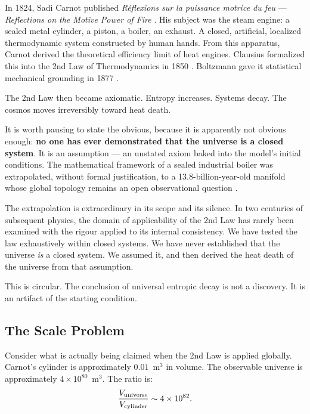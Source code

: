 \documentclass[aps,prd,11pt,onecolumn,superscriptaddress,nofootinbib,floatfix]{revtex4-2}
\begin{document}
In 1824, Sadi Carnot published \textit{R\'eflexions sur la puissance motrice du feu} --- \textit{Reflections on the Motive Power of Fire} \cite{carnot_1824}. His subject was the steam engine: a sealed metal cylinder, a piston, a boiler, an exhaust. A closed, artificial, localized thermodynamic system constructed by human hands. From this apparatus, Carnot derived the theoretical efficiency limit of heat engines. Clausius formalized this into the 2nd Law of Thermodynamics in 1850 \cite{clausius_1850}. Boltzmann gave it statistical mechanical grounding in 1877 \cite{boltzmann_1877}.

The 2nd Law then became axiomatic. Entropy increases. Systems decay. The cosmos moves irreversibly toward heat death.

It is worth pausing to state the obvious, because it is apparently not obvious enough: \textbf{no one has ever demonstrated that the universe is a closed system}. It is an assumption --- an unstated axiom baked into the model's initial conditions. The mathematical framework of a sealed industrial boiler was extrapolated, without formal justification, to a 13.8-billion-year-old manifold whose global topology remains an open observational question \cite{compact_promise}.

The extrapolation is extraordinary in its scope and its silence. In two centuries of subsequent physics, the domain of applicability of the 2nd Law has rarely been examined with the rigour applied to its internal consistency. We have tested the law exhaustively within closed systems. We have never established that the universe \textit{is} a closed system. We assumed it, and then derived the heat death of the universe from that assumption.

This is circular. The conclusion of universal entropic decay is not a discovery. It is an artifact of the starting condition.

\subsection{The Scale Problem}

Consider what is actually being claimed when the 2nd Law is applied globally. Carnot's cylinder is approximately $0.01$~m$^3$ in volume. The observable universe is approximately $4 \times 10^{80}$~m$^3$. The ratio is:
\begin{equation}
    \frac{V_{\rm universe}}{V_{\rm cylinder}} \sim 4 \times 10^{82}.
\end{equation}
\end{document}
